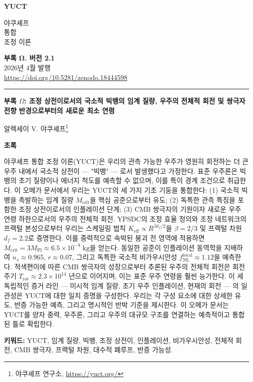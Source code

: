 \documentclass[11pt,a4paper]{article}
\newcommand{\Keff}{K_{\mathrm{eff}}}
\newcommand{\makeheader}{%
	\noindent
	\begin{minipage}{0.17\textwidth}
		\raggedright
		{\sffamily\bfseries\color{skyblue}\fontsize{46}{46}\selectfont YUCT}%
	\end{minipage}%
	\hspace{30pt}
	\begin{minipage}{0.32\textwidth}
		\raggedright
		{\sffamily\fontsize{11}{13}\selectfont 야쿠셰프\\ 통합\\ 조정 이론}%
	\end{minipage}%
	\hfill
	\begin{minipage}{0.38\textwidth}
		\raggedleft
		{\sffamily\bfseries 부록 Ω. 버전 2.1}\\
		{\sffamily 2026년 4월 발행}\\
		{\sffamily\footnotesize \url{https://doi.org/10.5281/zenodo.18444598}}%
	\end{minipage}
	\par\vspace{5pt}
	\noindent\textcolor{gold}{\rule{\textwidth}{1.6pt}}
	\par\vspace{0pt}
}
\begin{document}
	\renewcommand{\thepage}{\arabic{page}}
	\thispagestyle{firstpage}
	\makeheader
	
	\vspace{0cm}
	{\LARGE\bfseries 부록 \(\Omega\): 조정 상전이로서의 국소적 빅뱅의 임계 질량, 우주의 전체적 회전 및 쌍극자 전향 반경으로부터의 새로운 최소 연령 \par}
	\vspace{0.2cm}
	
	{\large 알렉세이 V. 야쿠셰프\footnote{야쿠셰프 연구소, \url{https://yuct.org/}}} \\
	\vspace{0.0cm}
	
	{\color{darkblue}\textbf{\LARGE 초록}} \par
	{\large
		\noindent
		야쿠셰프 통합 조정 이론(YUCT)은 우리의 관측 가능한 우주가 영원히 회전하는 더 큰 우주 내에서 국소적 상전이 — "빅뱅" — 로서 발생했다고 가정한다. 표준 우주론은 빅뱅의 초기 질량이나 에너지 척도를 예측할 수 없으며, 이를 특이 경계 조건으로 취급한다. 이 오메가 문서에서 우리는 YUCT의 세 가지 기초 기둥을 통합한다: (1) 국소적 빅뱅을 촉발하는 임계 질량 \(M_{\mathrm{crit}}\)을 핵심 공준으로부터 유도; (2) 독특한 관측 특징을 포함한 조정 상전이로서의 인플레이션 단계; (3) CMB 쌍극자의 기원이자 새로운 우주 연령 하한으로서의 우주의 전체적 회전. YPSDC의 조정 효율 정의와 조정 네트워크의 프랙털 본성으로부터 우리는 스케일링 법칙 \(\Keff \propto R^{\beta d_f/2}\)을 \(\beta = 2/3\) 및 프랙털 차원 \(d_f = 2.2\)로 증명한다. 이를 중력적으로 속박된 붕괴 전 영역에 적용하면 \(M_{\mathrm{crit}} = 3 M_{\mathrm{Pl}} \approx 6.5 \times 10^{-8}\;\text{kg}\)을 얻는다. 동일한 공준이 인플레이션 동역학을 지배하여 \(n_s \approx 0.965\), \(r \approx 0.07\), 그리고 독특한 국소적 비가우시안성 \(f_{\mathrm{NL}}^{\mathrm{local}} \approx 1.12\)을 예측한다. 적색편이에 따른 CMB 쌍극자의 성장으로부터 추론된 우주의 전체적 회전은 회전 주기 \(T_{\mathrm{rot}} \approx 2.3 \times 10^{14}\) 년으로 이어지며, 이는 표준 우주 연령을 훨씬 능가한다. 이 세 독립적인 증거 라인 — 미시적 임계 질량, 초기 우주 인플레이션, 현재의 회전 — 의 일관성은 YUCT에 대한 일치 증명을 구성한다. 우리는 각 구성 요소에 대한 상세한 유도, 반증 가능한 예측, 그리고 명시적인 반박 기준을 제시한다. 이 오메가 문서는 YUCT를 양자 중력, 우주론, 그리고 우주의 대규모 구조를 연결하는 예측적이고 통합된 틀로 확립한다.
	}
	
	\vspace{0.1cm}
	\noindent
	{\color{darkblue}\textbf{키워드:}} YUCT, 임계 질량, 빅뱅, 조정 상전이, 인플레이션, 비가우시안성, 전체적 회전, CMB 쌍극자, 프랙털 차원, 대수적 폐루프, 반증 가능성.
	
\end{document}
